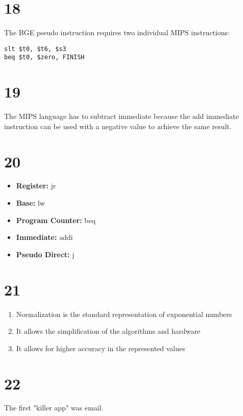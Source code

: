 \documentclass[a4paper,11pt]{article}
\begin{document}
\section*{18}
The BGE pseudo instruction requires two individual MIPS instructions:
\begin{verbatim}
slt $t0, $t6, $s3
beq $t0, $zero, FINISH 
\end{verbatim}



\section*{19}
The MIPS language has to subtract immediate because the add immediate instruction can be used with a negative value to achieve the same result.  

\section*{20}
\begin{itemize}
  \item {\bf Register: } jr
  \item {\bf Base: } lw
  \item {\bf Program Counter: } beq
  \item {\bf Immediate: } addi
  \item {\bf Pseudo Direct:}  j
\end{itemize}


\section*{21}

\begin{enumerate}
  \item Normalization is the standard representation of exponential numbers
  \item It allows the simplification of the algorithms and hardware
  \item It allows for higher accuracy in the represented values
\end{enumerate}


\section*{22}
The first "killer app" was email.
\end{document}
